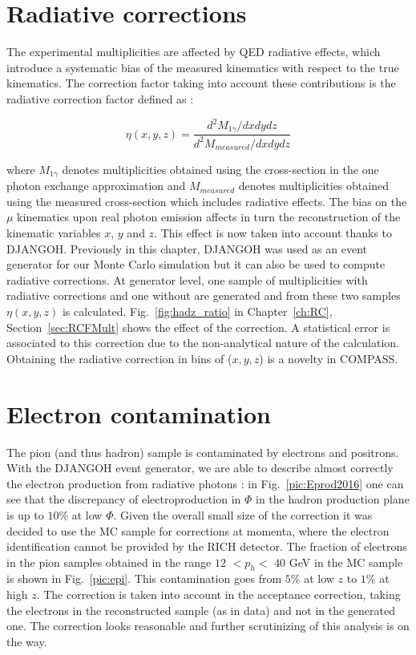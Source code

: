 \section{Radiative corrections} \label{sec:rcf}

The experimental multiplicities are affected by QED radiative effects, which introduce a systematic bias of the measured kinematics with respect to the true kinematics. The correction factor taking into account these contributions is the radiative correction factor defined as :

\begin{equation}
	\eta(x,y,z) = \frac{d^2 M_{1\gamma}/dxdydz}{d^2 M_{measured}/dxdydz}
\end{equation}

where $M_{1\gamma}$ denotes multiplicities obtained using the cross-section in the one photon exchange approximation and $M_{measured}$ denotes multiplicities obtained using the measured cross-section which includes radiative effects. The bias on the $\mu$ kinematics upon real photon emission affects in turn the reconstruction of the kinematic variables $x$, $y$ and $z$. This effect is now taken into account thanks to DJANGOH. Previously in this chapter, DJANGOH was used as an event generator for our Monte Carlo simulation but it can also be used to compute radiative corrections. At generator level, one sample of multiplicities with radiative corrections and one without are generated and from these two samples $\eta(x,y,z)$ is calculated. Fig.~\ref{fig:hadz_ratio} in Chapter~\ref{ch:RC}, Section~\ref{sec:RCFMult} shows the effect of the correction. A statistical error is associated to this correction due to the non-analytical nature of the calculation. Obtaining the radiative correction in bins of ($x,y,z$) is a novelty in COMPASS.

\section{Electron contamination}

The pion (and thus hadron) sample is contaminated by electrons and positrons. With the DJANGOH event generator, we are able to describe almost correctly the electron production from radiative photons : in Fig.~\ref{pic:Eprod2016} one can see that the discrepancy of electroproduction in $\Phi$ in the hadron production plane is up to $10$\% at low $\Phi$. Given the overall small size of the correction it was decided to use the MC sample for corrections at momenta, where the electron identification cannot be provided by the RICH detector. The fraction of electrons in the pion samples obtained in the range $12$ $< p_h <$ $40$ GeV in the MC sample is shown in Fig.~\ref{pic:epi}. This contamination goes from $5$\% at low $z$ to $1$\% at high $z$. The correction is taken into account in the acceptance correction, taking the electrons in the reconstructed sample (as in data) and not in the generated one. The correction looks reasonable and further scrutinizing of this analysis is on the way.

